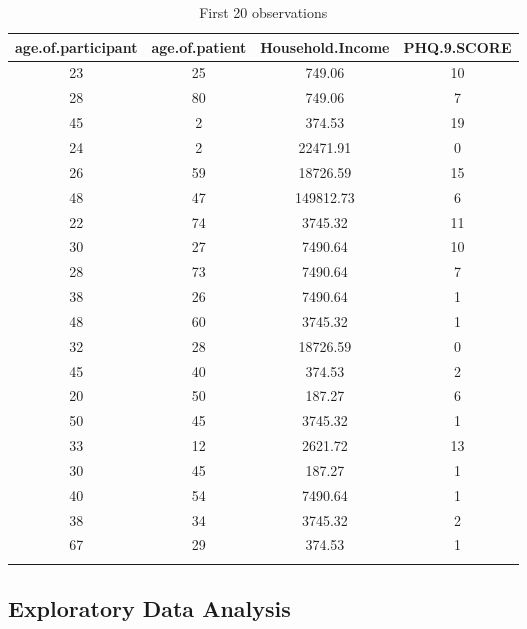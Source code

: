 \documentclass[12pt]{article}
\numberwithin{equation}{section}
\begin{document}
\begin{longtable}[t]{|c|c|c|c|}
	\hline
	age.of.participant & age.of.patient & Household.Income & PHQ.9.SCORE\\
	\hline
	23 & 25 & 749.06 & 10\\
	28 & 80 & 749.06 & 7\\
	45 & 2 & 374.53 & 19\\
	24 & 2 & 22471.91 & 0\\
	26 & 59 & 18726.59 & 15\\
	
	48 & 47 & 149812.73 & 6\\
	22 & 74 & 3745.32 & 11\\
	30 & 27 & 7490.64 & 10\\
	28 & 73 & 7490.64 & 7\\
	38 & 26 & 7490.64 & 1\\
	
	48 & 60 & 3745.32 & 1\\
	32 & 28 & 18726.59 & 0\\
	45 & 40 & 374.53 & 2\\
	20 & 50 & 187.27 & 6\\
	50 & 45 & 3745.32 & 1\\
	
	33 & 12 & 2621.72 & 13\\
	30 & 45 & 187.27 & 1\\
	40 & 54 & 7490.64 & 1\\
	38 & 34 & 3745.32 & 2\\
	67 & 29 & 374.53 & 1\\
	\hline
	
	\caption{\label{tab:table 1}First 20 observations}
\end{longtable}

\subsection{Exploratory Data Analysis}
\end{document}
